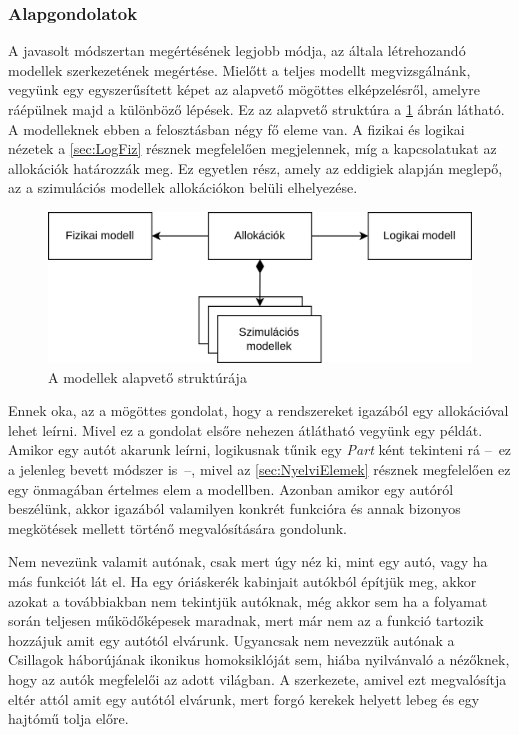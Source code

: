         \subsubsection{Alapgondolatok} \label{sec:Alapgondolatok}
        A javasolt módszertan megértésének legjobb módja, az általa létrehozandó modellek szerkezetének megértése. Mielőtt a teljes modellt megvizsgálnánk, vegyünk egy egyszerűsített képet az alapvető mögöttes elképzelésről, amelyre ráépülnek majd a különböző lépések. Ez az alapvető struktúra a \ref{fig:Alapstruktura} ábrán látható.
        A modelleknek ebben a felosztásban négy fő eleme van. A fizikai és logikai nézetek a \ref{sec:LogFiz} résznek megfelelően megjelennek, míg a kapcsolatukat az allokációk határozzák meg.
        Ez egyetlen rész, amely az eddigiek alapján meglepő, az a szimulációs modellek allokációkon belüli elhelyezése.
        \begin{figure}[!ht]
            \centering
            \includegraphics[width=150mm, keepaspectratio]{figures/Alapelemek.drawio.png}
            \caption{A modellek alapvető struktúrája} 
            \label{fig:Alapstruktura}
        \end{figure}

        Ennek oka, az a mögöttes gondolat, hogy a rendszereket igazából egy allokációval lehet leírni. Mivel ez a gondolat elsőre nehezen átlátható vegyünk egy példát.
        Amikor egy autót akarunk leírni, logikusnak tűnik egy \emph{Part} ként tekinteni rá --~ez a jelenleg bevett módszer is~--, mivel az \ref{sec:NyelviElemek} résznek megfelelően ez egy önmagában értelmes elem a modellben.
        Azonban amikor egy autóról beszélünk, akkor igazából valamilyen konkrét funkcióra és annak bizonyos megkötések mellett történő megvalósítására gondolunk.
        
        Nem nevezünk valamit autónak, csak mert úgy néz ki, mint egy autó, vagy ha más funkciót lát el. Ha egy óriáskerék kabinjait autókból építjük meg, akkor azokat a továbbiakban nem tekintjük autóknak, még akkor sem ha a folyamat során teljesen működőképesek maradnak, mert már nem az a funkció tartozik hozzájuk amit egy autótól elvárunk.
        Ugyancsak nem nevezzük autónak a Csillagok háborújának ikonikus homoksiklóját sem, hiába nyilvánvaló a nézőknek, hogy az autók megfelelői az adott világban. A szerkezete, amivel ezt megvalósítja eltér attól amit egy autótól elvárunk, mert forgó kerekek helyett lebeg és egy hajtómű tolja előre.

